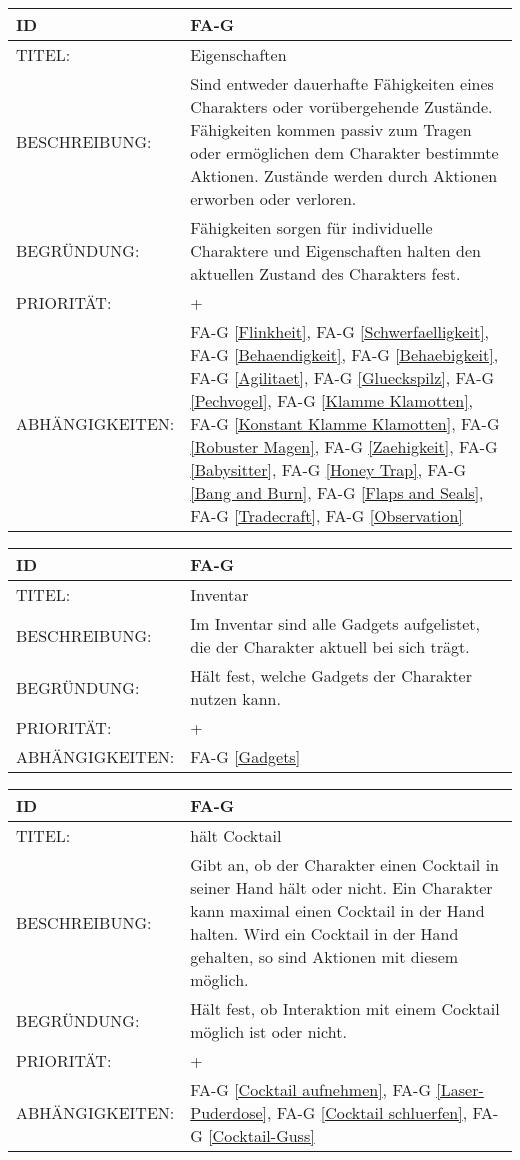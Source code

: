 \begin{tabularx}{16cm}{l|X}
	{table}\label{Eigenschaften}
	\textbf{ID} & \textbf{FA-G \arabic{table}} \\
	\hline
	TITEL: & Eigenschaften \\
	\hline
	BESCHREIBUNG: & Sind entweder dauerhafte Fähigkeiten eines Charakters oder vorübergehende Zustände. Fähigkeiten kommen passiv zum Tragen oder ermöglichen dem Charakter bestimmte Aktionen. Zustände werden durch Aktionen erworben oder verloren.\\
	\hline
	BEGRÜNDUNG: & Fähigkeiten sorgen für individuelle Charaktere und Eigenschaften halten den aktuellen Zustand des Charakters fest. \\
	\hline
	PRIORITÄT: & +\\
	\hline
	ABHÄNGIGKEITEN: & FA-G \ref{Flinkheit}, FA-G \ref{Schwerfaelligkeit}, FA-G \ref{Behaendigkeit}, FA-G \ref{Behaebigkeit}, FA-G \ref{Agilitaet}, FA-G \ref{Glueckspilz}, FA-G \ref{Pechvogel}, FA-G \ref{Klamme Klamotten}, FA-G \ref{Konstant Klamme Klamotten}, FA-G \ref{Robuster Magen}, FA-G \ref{Zaehigkeit}, FA-G \ref{Babysitter}, FA-G \ref{Honey Trap}, FA-G \ref{Bang and Burn}, FA-G \ref{Flaps and Seals}, FA-G \ref{Tradecraft}, FA-G \ref{Observation} \\
\end{tabularx}

\begin{tabularx}{16cm}{l|X}
	{table}\label{Inventar}
	\textbf{ID} & \textbf{FA-G \arabic{table}} \\
	\hline
	TITEL: & Inventar \\
	\hline
	BESCHREIBUNG: & Im Inventar sind alle Gadgets aufgelistet, die der Charakter aktuell bei sich trägt.\\
	\hline
	BEGRÜNDUNG: & Hält fest, welche Gadgets der Charakter nutzen kann.\\
	\hline
	PRIORITÄT: & +\\
	\hline
	ABHÄNGIGKEITEN: & FA-G \ref{Gadgets}\\
\end{tabularx}

\begin{tabularx}{16cm}{l|X}
	{table}\label{haelt Cocktail}
	\textbf{ID} & \textbf{FA-G \arabic{table}} \\
	\hline
	TITEL: & hält Cocktail \\
	\hline
	BESCHREIBUNG: & Gibt an, ob der Charakter einen Cocktail in seiner Hand hält oder nicht. Ein Charakter kann maximal einen Cocktail in der Hand halten. Wird ein Cocktail in der Hand gehalten, so sind Aktionen mit diesem möglich. \\
	\hline
	BEGRÜNDUNG: & Hält fest, ob Interaktion mit einem Cocktail möglich ist oder nicht.\\
	\hline
	PRIORITÄT: & +\\
	\hline
	ABHÄNGIGKEITEN: & FA-G \ref{Cocktail aufnehmen}, FA-G \ref{Laser-Puderdose}, FA-G \ref{Cocktail schluerfen}, FA-G \ref{Cocktail-Guss}\\
\end{tabularx}

